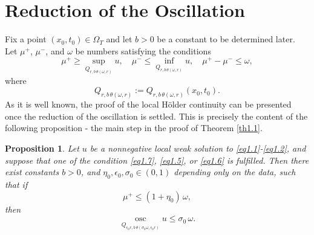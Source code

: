 \documentclass[a4paper,11pt,fullpage]{article}
\DeclareMathOperator*{\osc}{osc}
\numberwithin{equation}{section}
\newtheorem{lemma}{Lemma}[section]
\newtheorem{propo}{Proposition}[section]
\begin{document}





\section{Reduction of the Oscillation} \label{sec-red-osc}

Fix a point $(x_0, t_0) \in \Omega_T$ and let $b>0$ be a constant to be determined later. Let $\mu^+$, $\mu^-$, and $\omega$ be numbers satisfying the conditions
$$\mu^+\geqslant \sup\limits_{Q_{r, b\,\theta(\omega, r)}}u,\quad \mu^-\leqslant \inf\limits_{Q_{r, b\,\theta(\omega, r)}} u,\quad \mu^+-\mu^-\leqslant \omega,$$
where 
\[Q_{r, b\,\theta(\omega, r)}:=Q_{r, b\,\theta(\omega, r)}(x_0, t_0).\]
As it is well known, the proof of the local H\"older continuity can be presented once the reduction of the oscillation is settled. This is precisely the content of the following proposition - the main step in the proof of Theorem \ref{th1.1}.

\begin{propo}\label{pr1.1}
Let $u$ be a nonnegative local weak solution to \eqref{eq1.1}-\eqref{eq1.2}, and suppose that one of the condition \eqref{eq1.7}, \eqref{eq1.5}, or \eqref{eq1.6} is fulfilled.  Then there exist constants $b>0$, and $\eta_0, \epsilon_0, \sigma_0\in (0, 1)$ depending only on the data, such that if
\begin{equation}\label{eq1.8}
\mu^+\leqslant (1+\eta_0)\,\omega,
\end{equation}
then
\begin{equation}\label{eq1.9}
\osc\limits_{Q_{\epsilon_0 r,  b\,\theta(\sigma_0\omega, \epsilon_0 r)}} u \leqslant \sigma_0\,\omega.
\end{equation}
\end{propo}
\end{document}
